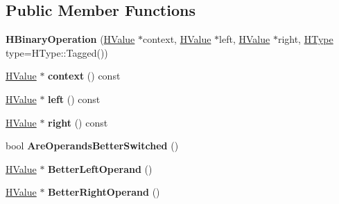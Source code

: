 \subsection*{Public Member Functions}
\begin{DoxyCompactItemize}
\item 
{\bfseries H\+Binary\+Operation} (\hyperlink{classv8_1_1internal_1_1_h_value}{H\+Value} $\ast$context, \hyperlink{classv8_1_1internal_1_1_h_value}{H\+Value} $\ast$left, \hyperlink{classv8_1_1internal_1_1_h_value}{H\+Value} $\ast$right, \hyperlink{classv8_1_1internal_1_1_h_type}{H\+Type} type=H\+Type\+::\+Tagged())\hypertarget{classv8_1_1internal_1_1_h_binary_operation_a56faea075155f95059c1cb581bc20d59}{}\label{classv8_1_1internal_1_1_h_binary_operation_a56faea075155f95059c1cb581bc20d59}

\item 
\hyperlink{classv8_1_1internal_1_1_h_value}{H\+Value} $\ast$ {\bfseries context} () const \hypertarget{classv8_1_1internal_1_1_h_binary_operation_ab8f811855099ff11f8dd1c11ede5da26}{}\label{classv8_1_1internal_1_1_h_binary_operation_ab8f811855099ff11f8dd1c11ede5da26}

\item 
\hyperlink{classv8_1_1internal_1_1_h_value}{H\+Value} $\ast$ {\bfseries left} () const \hypertarget{classv8_1_1internal_1_1_h_binary_operation_a884245887fc3c60c5a98cd43219e2db8}{}\label{classv8_1_1internal_1_1_h_binary_operation_a884245887fc3c60c5a98cd43219e2db8}

\item 
\hyperlink{classv8_1_1internal_1_1_h_value}{H\+Value} $\ast$ {\bfseries right} () const \hypertarget{classv8_1_1internal_1_1_h_binary_operation_a64ea41aa271eff3dcebdf633b07c21ab}{}\label{classv8_1_1internal_1_1_h_binary_operation_a64ea41aa271eff3dcebdf633b07c21ab}

\item 
bool {\bfseries Are\+Operands\+Better\+Switched} ()\hypertarget{classv8_1_1internal_1_1_h_binary_operation_abd65d8c23e876efc909fec628f5b4698}{}\label{classv8_1_1internal_1_1_h_binary_operation_abd65d8c23e876efc909fec628f5b4698}

\item 
\hyperlink{classv8_1_1internal_1_1_h_value}{H\+Value} $\ast$ {\bfseries Better\+Left\+Operand} ()\hypertarget{classv8_1_1internal_1_1_h_binary_operation_a0472b9cc043d93ab89310680ad21803a}{}\label{classv8_1_1internal_1_1_h_binary_operation_a0472b9cc043d93ab89310680ad21803a}

\item 
\hyperlink{classv8_1_1internal_1_1_h_value}{H\+Value} $\ast$ {\bfseries Better\+Right\+Operand} ()\hypertarget{classv8_1_1internal_1_1_h_binary_operation_a3a779898407adae54e88df623d47169b}{}\label{classv8_1_1internal_1_1_h_binary_operation_a3a779898407adae54e88df623d47169b}


\end{DoxyCompactItemize}
